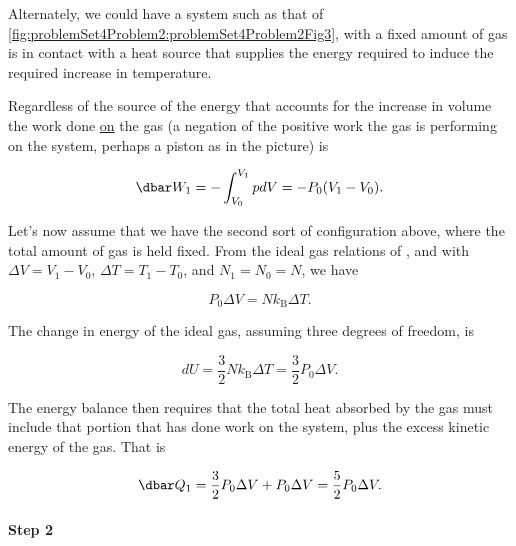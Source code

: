 {Alternately, we could have a system such as that of \cref{fig:problemSet4Problem2:problemSet4Problem2Fig3}, with a fixed amount of gas is in contact with a heat source that supplies the energy required to induce the required increase in temperature.


Regardless of the source of the energy that accounts for the increase in volume the work done \underline{on} the gas (a negation of the positive work the gas is performing on the system, perhaps a piston as in the picture) is

\begin{equation}\label{eqn:basicStatMechProblemSet4Problem2:60}
\dbar W_1 = - \int_{V_0}^{V_1} p dV = -P_0 (V_1 - V_0).
\end{equation}

Let's now assume that we have the second sort of configuration above, where the total amount of gas is held fixed.  From the ideal gas relations of , and with $\Delta V = V_1 - V_0$, $\Delta T = T_1 - T_0$, and $N_1 = N_0 = N$, we have

\begin{equation}\label{eqn:basicStatMechProblemSet4Problem2:80}
P_0 \Delta V = N k_{\mathrm{B}} \Delta T.
\end{equation}

The change in energy of the ideal gas, assuming three degrees of freedom, is

\begin{equation}\label{eqn:basicStatMechProblemSet4Problem2:100}
d U = \frac{3}{2} N k_{\mathrm{B}} \Delta T = \frac{3}{2} P_0 \Delta V.
\end{equation}

The energy balance then requires that the total heat absorbed by the gas must include that portion that has done work on the system, plus the excess kinetic energy of the gas.  That is

\begin{equation}\label{eqn:basicStatMechProblemSet4Problem2:120}
\dbar Q_1 = \frac{3}{2} P_0 \Delta V + P_0 \Delta V = \frac{5}{2} P_0 \Delta V.
\end{equation}

\paragraph{Step 2}

}

